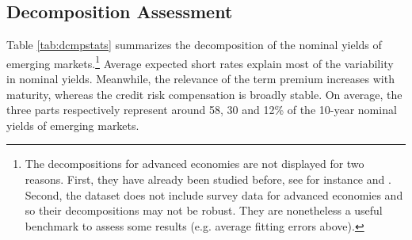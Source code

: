 {\subsection{Decomposition Assessment}
\iftoggle{toclinks}{\gototoc}{} %


%	

Table \ref{tab:dcmpstats} summarizes the decomposition of the nominal yields of emerging markets.\footnote{ The decompositions for advanced economies are not displayed for two reasons. First, they have already been studied before, see for instance \cite{Wright:2011} and \cite{ACDM:2019}. Second, the dataset does not include survey data for advanced economies and so their decompositions may not be robust. They are nonetheless a useful benchmark to assess some results (e.g. average fitting errors above).} %
Average expected short rates explain most of the variability in nominal yields. %
Meanwhile, the relevance of the term premium increases with maturity, whereas the credit risk compensation is broadly stable. %
On average, the three parts respectively %
represent around 58, 30 and 12\% of the 10-year nominal yields of emerging markets.

}
